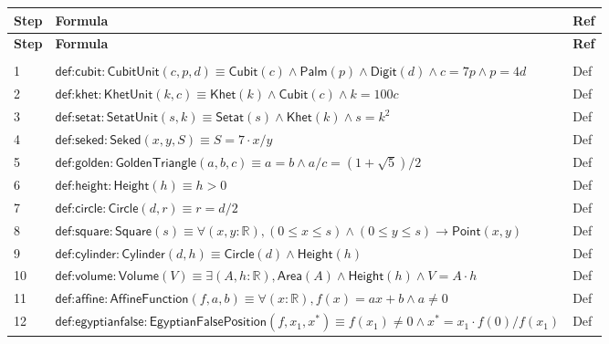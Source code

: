 \documentclass[12pt]{amsart}
\newcommand{\br}{,\allowbreak}
\newcommand{\R}{\mathbb{R}}
\newenvironment{prooftable}{%
	\renewcommand{\arraystretch}{1.2}%
	\setlength{\tabcolsep}{4pt}%
	\setlength{\arrayrulewidth}{0.05pt}
	\tiny
	\sloppy
	\begin{longtable}{
			|>{\centering\arraybackslash}m{0.7cm}|
			>{\raggedright\centering\arraybackslash}m{0.70\textwidth}|
			>{\centering\arraybackslash}m{3.5cm}|  %
		}%
		\hline
		\textbf{Step} & \centering\textbf{Formula} & \textbf{Ref} \\
		\hline
		\endfirsthead
		\hline
		\textbf{Step} & \centering\textbf{Formula} & \textbf{Ref} \\
		\hline
		\endhead
		\hline
		\multicolumn{3}{r}{\textit{Continued on next page}} \\
		\endfoot
		\hline
		\endlastfoot
	}{%
	\end{longtable}%
}
\newcommand{\thicksoliddoubleline}{%
	\noalign{\vskip1pt}%
	\noalign{\hrule height 0.2pt}%
	\noalign{\vskip0.2pt}%
	\noalign{\hrule height 0.2pt}%
	\noalign{\vskip1pt}%
}
\begin{document}
\begin{prooftable}
	\thicksoliddoubleline
	1 & $\textsf{def:cubit}: \textsf{CubitUnit}(c \br p \br d) \equiv \textsf{Cubit}(c) \land \textsf{Palm}(p) \land \textsf{Digit}(d) \land c=7p \land p=4d$ & Def \\
	\thicksoliddoubleline
	2 & $\textsf{def:khet}: \textsf{KhetUnit}(k \br c) \equiv \textsf{Khet}(k) \land \textsf{Cubit}(c) \land k=100c$ & Def \\
	\thicksoliddoubleline
	3 & $\textsf{def:setat}: \textsf{SetatUnit}(s \br k) \equiv \textsf{Setat}(s) \land \textsf{Khet}(k) \land s=k^2$ & Def \\
	\thicksoliddoubleline
	4 & $\textsf{def:seked}: \textsf{Seked}(x \br y \br S) \equiv S = 7 \cdot x/y$ & Def \\
	\thicksoliddoubleline
	5 & $\textsf{def:golden}: \textsf{GoldenTriangle}(a \br b \br c) \equiv a=b \land a/c = (1+\sqrt{5})/2$ & Def \\
	\thicksoliddoubleline
	6 & $\textsf{def:height}: \textsf{Height}(h) \equiv h>0$ & Def \\
	\thicksoliddoubleline
	7 & $\textsf{def:circle}: \textsf{Circle}(d \br r) \equiv r=d/2$ & Def \\
	\thicksoliddoubleline
	8 & $\textsf{def:square}: \textsf{Square}(s) \equiv \forall (x \br y:\R) \br  (0\le x\le s)\land(0\le y\le s)\to \textsf{Point}(x \br y)$ & Def \\
	\thicksoliddoubleline
	9 & $\textsf{def:cylinder}: \textsf{Cylinder}(d \br h) \equiv \textsf{Circle}(d) \land \textsf{Height}(h)$ & Def \\
	\thicksoliddoubleline
	10 & $\textsf{def:volume}: \textsf{Volume}(V) \equiv \exists (A \br h:\R) \br  \textsf{Area}(A)\land \textsf{Height}(h)\land V=A\cdot h$ & Def \\
	\thicksoliddoubleline
	11 & $\textsf{def:affine}: \textsf{AffineFunction}(f \br a \br b) \equiv \forall (x:\R) \br  f(x)=a x+b \land a\ne0$ & Def \\
	\thicksoliddoubleline
	12 & $\textsf{def:egyptianfalse}: \textsf{EgyptianFalsePosition}(f \br x_1 \br x^*) \equiv f(x_1)\ne0 \land x^* = x_1\cdot f(0)/f(x_1)$ & Def \\

\end{prooftable}
\end{document}
